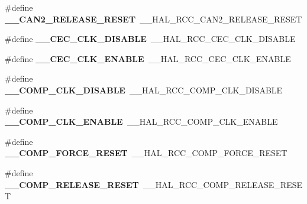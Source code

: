 \begin{DoxyCompactItemize}
\item 
\hypertarget{group___h_a_l___r_c_c___aliased_ga9d24d2c5718973a68c2e6b523d0cd8cf}{\#define {\bfseries \-\_\-\-\_\-\-C\-A\-N2\-\_\-\-R\-E\-L\-E\-A\-S\-E\-\_\-\-R\-E\-S\-E\-T}~\-\_\-\-\_\-\-H\-A\-L\-\_\-\-R\-C\-C\-\_\-\-C\-A\-N2\-\_\-\-R\-E\-L\-E\-A\-S\-E\-\_\-\-R\-E\-S\-E\-T}\label{group___h_a_l___r_c_c___aliased_ga9d24d2c5718973a68c2e6b523d0cd8cf}

\item 
\hypertarget{group___h_a_l___r_c_c___aliased_gae6139fc836b41ec3314464257ac120b5}{\#define {\bfseries \-\_\-\-\_\-\-C\-E\-C\-\_\-\-C\-L\-K\-\_\-\-D\-I\-S\-A\-B\-L\-E}~\-\_\-\-\_\-\-H\-A\-L\-\_\-\-R\-C\-C\-\_\-\-C\-E\-C\-\_\-\-C\-L\-K\-\_\-\-D\-I\-S\-A\-B\-L\-E}\label{group___h_a_l___r_c_c___aliased_gae6139fc836b41ec3314464257ac120b5}

\item 
\hypertarget{group___h_a_l___r_c_c___aliased_gacd96e6033b91cf91492c3e1c69d4cdbd}{\#define {\bfseries \-\_\-\-\_\-\-C\-E\-C\-\_\-\-C\-L\-K\-\_\-\-E\-N\-A\-B\-L\-E}~\-\_\-\-\_\-\-H\-A\-L\-\_\-\-R\-C\-C\-\_\-\-C\-E\-C\-\_\-\-C\-L\-K\-\_\-\-E\-N\-A\-B\-L\-E}\label{group___h_a_l___r_c_c___aliased_gacd96e6033b91cf91492c3e1c69d4cdbd}

\item 
\hypertarget{group___h_a_l___r_c_c___aliased_gab36bc33375b159e27da274aa0a719371}{\#define {\bfseries \-\_\-\-\_\-\-C\-O\-M\-P\-\_\-\-C\-L\-K\-\_\-\-D\-I\-S\-A\-B\-L\-E}~\-\_\-\-\_\-\-H\-A\-L\-\_\-\-R\-C\-C\-\_\-\-C\-O\-M\-P\-\_\-\-C\-L\-K\-\_\-\-D\-I\-S\-A\-B\-L\-E}\label{group___h_a_l___r_c_c___aliased_gab36bc33375b159e27da274aa0a719371}

\item 
\hypertarget{group___h_a_l___r_c_c___aliased_ga27473848b33e4d60a45f8b426a9582b8}{\#define {\bfseries \-\_\-\-\_\-\-C\-O\-M\-P\-\_\-\-C\-L\-K\-\_\-\-E\-N\-A\-B\-L\-E}~\-\_\-\-\_\-\-H\-A\-L\-\_\-\-R\-C\-C\-\_\-\-C\-O\-M\-P\-\_\-\-C\-L\-K\-\_\-\-E\-N\-A\-B\-L\-E}\label{group___h_a_l___r_c_c___aliased_ga27473848b33e4d60a45f8b426a9582b8}

\item 
\hypertarget{group___h_a_l___r_c_c___aliased_gacf0479c92472c77e5b4016b57cd2a932}{\#define {\bfseries \-\_\-\-\_\-\-C\-O\-M\-P\-\_\-\-F\-O\-R\-C\-E\-\_\-\-R\-E\-S\-E\-T}~\-\_\-\-\_\-\-H\-A\-L\-\_\-\-R\-C\-C\-\_\-\-C\-O\-M\-P\-\_\-\-F\-O\-R\-C\-E\-\_\-\-R\-E\-S\-E\-T}\label{group___h_a_l___r_c_c___aliased_gacf0479c92472c77e5b4016b57cd2a932}

\item 
\hypertarget{group___h_a_l___r_c_c___aliased_gadee677453c7afbbae5acb992debe1e3b}{\#define {\bfseries \-\_\-\-\_\-\-C\-O\-M\-P\-\_\-\-R\-E\-L\-E\-A\-S\-E\-\_\-\-R\-E\-S\-E\-T}~\-\_\-\-\_\-\-H\-A\-L\-\_\-\-R\-C\-C\-\_\-\-C\-O\-M\-P\-\_\-\-R\-E\-L\-E\-A\-S\-E\-\_\-\-R\-E\-S\-E\-T}\label{group___h_a_l___r_c_c___aliased_gadee677453c7afbbae5acb992debe1e3b}


\end{DoxyCompactItemize}
